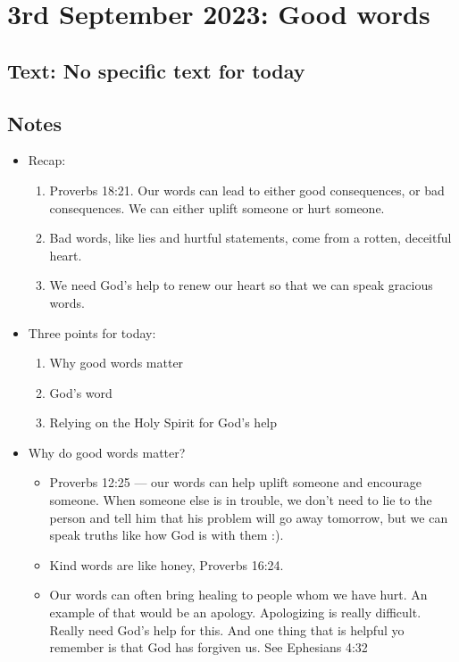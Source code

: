 \setcounter{figure}{0}

\section{3rd September 2023: Good words}
\subsection*{Text: No specific text for today}
\subsection*{Notes}
\begin{itemize}
  \item{Recap:
  \begin{enumerate}
    \item{Proverbs 18:21. Our words can lead to either good consequences, or bad consequences. We can either uplift someone or hurt someone.}
    \item{Bad words, like lies and hurtful statements, come from a rotten, deceitful heart.}
    \item{We need God’s help to renew our heart so that we can speak gracious words.}
  \end{enumerate}}
  \item{Three points for today:
  \begin{enumerate}
    \item{Why good words matter}
    \item{God's word}
    \item{Relying on the Holy Spirit for God’s help}
  \end{enumerate}}
  \item{Why do good words matter?
  \begin{itemize}
    \item{Proverbs 12:25 — our words can help uplift someone and encourage someone. When someone else is in trouble, we don’t need to lie to the person and tell him that his problem will go away tomorrow, but we can speak truths like how God is with them :).}
    \item{Kind words are like honey, Proverbs 16:24.}
    \item{Our words can often bring healing to people whom we have hurt. An example of that would be an apology. Apologizing is really difficult. Really need God’s help for this. And one thing that is helpful yo remember is that God has forgiven us. See Ephesians 4:32}

\end{itemize}}
\end{itemize}
